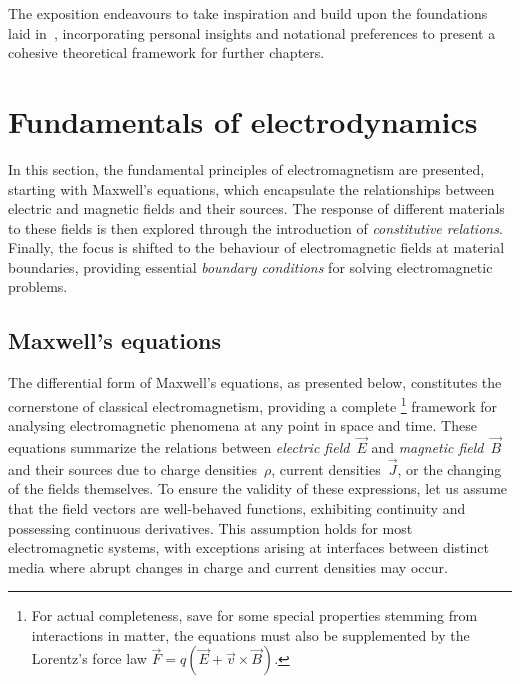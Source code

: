 \documentclass[11pt,a4paper,twoside,openany]{report}
\begin{document}
The exposition endeavours to take inspiration and build upon the foundations laid in~\parencite{balanis:advanced-engineering-electromagnetics,griffiths:introduction-to-electrodynamics,zangwill:modern-electrodynamics}, incorporating personal insights and notational preferences to present a cohesive theoretical framework for further chapters.

\section{Fundamentals of electrodynamics}
\label{section:fundamentals-of-electrodynamics}
In this section, the fundamental principles of electromagnetism are presented, starting with Maxwell's equations, which encapsulate the relationships between electric and magnetic fields and their sources. The response of different materials to these fields is then explored through the introduction of \emph{constitutive relations}. Finally, the focus is shifted to the behaviour of electromagnetic fields at material boundaries, providing essential \emph{boundary conditions} for solving electromagnetic problems.

\subsection{Maxwell's equations}
\label{subsection:maxwells-equations}
The differential form of Maxwell's equations, as presented below, constitutes the cornerstone of classical electromagnetism, providing a complete%
    \footnote{For actual completeness, save for some special properties stemming from interactions in matter, the equations must also be supplemented by the Lorentz's force law $\vec F = q(\vec E + \vec v \times \vec B)$.}
framework for analysing electromagnetic phenomena at any point in space and time. These equations summarize the relations between \emph{electric field}~$\vec E$ and \emph{magnetic field}~$\vec B$ and their sources due to charge densities~$\rho$, current densities~$\vec J$, or the changing of the fields themselves. To ensure the validity of these expressions, let us assume that the field vectors are well-behaved functions, exhibiting continuity and possessing continuous derivatives. This assumption holds for most electromagnetic systems, with exceptions arising at interfaces between distinct media where abrupt changes in charge and current densities may occur.
\end{document}
